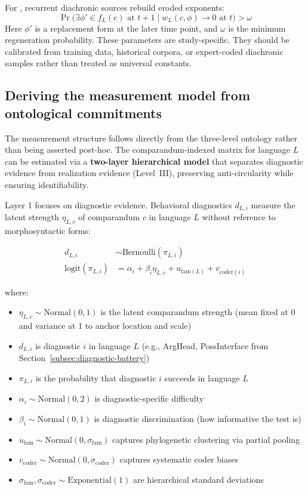 \documentclass[12pt]{article}
\begin{document}
For , recurrent diachronic sources rebuild eroded exponents:
\[
  \Pr\big(\exists \phi' \in f_L(c) \text{ at } t+1 \mid w_L(c,\phi) \to 0 \text{ at } t\big) > \omega
\]
Here $\phi'$ is a replacement form at the later time point, and $\omega$ is the minimum regeneration probability. These parameters are study-specific. They should be calibrated from training data, historical corpora, or expert-coded diachronic samples rather than treated as universal constants.

\subsection{Deriving the measurement model from ontological commitments}\label{subsec:measurement-derivation}

The measurement structure follows directly from the three-level ontology rather than being asserted post-hoc. The comparandum-indexed matrix for language $L$ can be estimated via a \textbf{two-layer hierarchical model} that separates diagnostic evidence from realization evidence (Level~III), preserving anti-circularity while ensuring identifiability.

Layer 1 focuses on diagnostic evidence. Behavioral diagnostics $d_{L,i}$ measure the latent strength $\eta_{L,c}$ of comparandum $c$ in language $L$ without reference to morphosyntactic forms:

\begin{align}
d_{L,i} &\sim \text{Bernoulli}(\pi_{L,i}) \\
\text{logit}(\pi_{L,i}) &= \alpha_i + \beta_i \eta_{L,c} + u_{\text{fam}(L)} + v_{\text{coder}(i)}
\end{align}

where:
\begin{itemize}
  \item $\eta_{L,c} \sim \text{Normal}(0, 1)$ is the latent comparandum strength (mean fixed at 0 and variance at 1 to anchor location and scale)
  \item $d_{L,i}$ is diagnostic $i$ in language $L$ (e.g., ArgHead, PossInterface from Section~\ref{subsec:diagnostic-battery})
  \item $\pi_{L,i}$ is the probability that diagnostic $i$ succeeds in language $L$
  \item $\alpha_i \sim \text{Normal}(0, 2)$ is diagnostic-specific difficulty
  \item $\beta_i \sim \text{Normal}(0, 1)$ is diagnostic discrimination (how informative the test is)
  \item $u_{\text{fam}} \sim \text{Normal}(0, \sigma_{\text{fam}})$ captures phylogenetic clustering via partial pooling
  \item $v_{\text{coder}} \sim \text{Normal}(0, \sigma_{\text{coder}})$ captures systematic coder biases
  \item $\sigma_{\text{fam}}, \sigma_{\text{coder}} \sim \text{Exponential}(1)$ are hierarchical standard deviations
\end{itemize}
\end{document}
